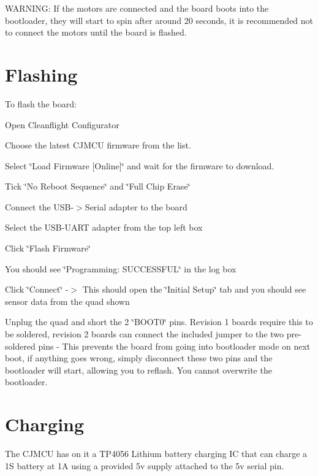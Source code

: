 W\+A\+R\+N\+I\+N\+G\+: If the motors are connected and the board boots into the bootloader, they will start to spin after around 20 seconds, it is recommended not to connect the motors until the board is flashed.

\section*{Flashing}

To flash the board\+:
\begin{DoxyItemize}
\item Open Cleanflight Configurator
\item Choose the latest C\+J\+M\+C\+U firmware from the list.
\item Select \char`\"{}\+Load Firmware \mbox{[}\+Online\mbox{]}\char`\"{} and wait for the firmware to download.
\item Tick \char`\"{}\+No Reboot Sequence\char`\"{} and \char`\"{}\+Full Chip Erase\char`\"{}
\item Connect the U\+S\+B-\/$>$Serial adapter to the board
\item Select the U\+S\+B-\/\+U\+A\+R\+T adapter from the top left box
\item Click \char`\"{}\+Flash Firmware\char`\"{}
\item You should see \char`\"{}\+Programming\+: S\+U\+C\+C\+E\+S\+S\+F\+U\+L\char`\"{} in the log box
\item Click \char`\"{}\+Connect\char`\"{} -\/$>$ This should open the \char`\"{}\+Initial Setup\char`\"{} tab and you should see sensor data from the quad shown
\item Unplug the quad and short the 2 \char`\"{}\+B\+O\+O\+T0\char`\"{} pins. Revision 1 boards require this to be soldered, revision 2 boards can connect the included jumper to the two pre-\/soldered pins -\/ This prevents the board from going into bootloader mode on next boot, if anything goes wrong, simply disconnect these two pins and the bootloader will start, allowing you to reflash. You cannot overwrite the bootloader.
\end{DoxyItemize}

\section*{Charging}

The C\+J\+M\+C\+U has on it a T\+P4056 Lithium battery charging I\+C that can charge a 1\+S battery at 1\+A using a provided 5v supply attached to the 5v serial pin.

